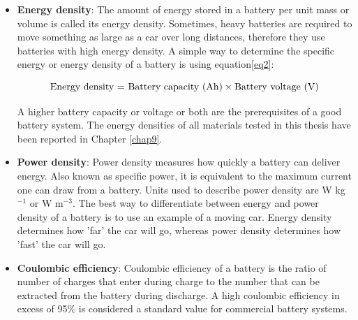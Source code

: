 \begin{itemize}
\item \textbf{Energy density}: The amount of energy stored in a battery per unit mass or volume is called its energy density. Sometimes, heavy batteries are required to move something as large as a car over long distances, therefore they use batteries with high energy density. A simple way to determine the specific energy or energy density of a battery is using equation\ref{eq2}:

\begin{equation} \label{eq2}
    \text{Energy density = } \text{Battery capacity (Ah)} \times \text{Battery voltage (V)}\\
\end{equation}

A higher battery capacity or voltage or both are the prerequisites of a good battery system. The energy densities of all materials tested in this thesis have been reported in Chapter \ref{chap9}.\\

\item \textbf{Power density}: Power density measures how quickly a battery can deliver energy. Also known as specific power, it is equivalent to the maximum current one can draw from a battery. Units used to describe power density are W kg$^{-1}$ or W m$^{-3}$. The best way to differentiate between energy and power density of a battery is to use an example of a moving car. Energy density determines how 'far' the car will go, whereas power density determines how 'fast' the car will go.

\item \textbf{Coulombic efficiency}: Coulombic efficiency of a battery is the ratio of number of charges that enter during charge to the number that can be extracted from the battery during discharge. A high coulombic efficiency in excess of 95\% is considered a standard value for commercial battery systems. 
\end{itemize}


